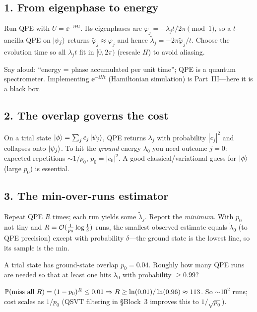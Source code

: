\documentclass[11pt]{article}
\begin{document}
\subsection*{1. From eigenphase to energy }
\begin{board}
Run QPE with $U=\ee^{-\ii Ht}$. Its eigenphases are $\varphi_j=-\lambda_j t/2\pi \pmod1$,
so a $t$-ancilla QPE on $\ket{\psi_j}$ returns $\widetilde\varphi_j\approx\varphi_j$ and
hence $\widetilde\lambda_j=-2\pi\widetilde\varphi_j/t$. Choose the evolution time so all
$\lambda_j t$ fit in $[0,2\pi)$ (rescale $H$) to avoid aliasing.
\end{board}
Say aloud: ``energy = phase accumulated per unit time''; QPE is a quantum spectrometer.
Implementing $\ee^{-\ii Ht}$ (Hamiltonian simulation) is Part~III---here it is a black box.

\subsection*{2. The overlap governs the cost }
\begin{board}
On a trial state $\ket\phi=\sum_j c_j\ket{\psi_j}$, QPE returns $\lambda_j$ with
probability $|c_j|^2$ and collapses onto $\ket{\psi_j}$. To hit the \emph{ground} energy
$\lambda_0$ you need outcome $j=0$: expected repetitions $\sim 1/p_0$, $p_0=|c_0|^2$.
A good classical/variational guess for $\ket\phi$ (large $p_0$) is essential.
\end{board}

\subsection*{3. The min-over-runs estimator }
\begin{board}
Repeat QPE $R$ times; each run yields some $\widetilde\lambda_{j}$. Report the
\emph{minimum}. With $p_0$ not tiny and $R=\mathcal{O}(\tfrac1{p_0}\log\tfrac1\delta)$ runs, the
smallest observed estimate equals $\widetilde\lambda_0$ (to QPE precision) except with
probability $\delta$---the ground state is the lowest line, so its sample is the min.
\end{board}

\begin{inclass}\label{ic:l5-overlap}
A trial state has ground-state overlap $p_0=0.04$. Roughly how many QPE runs are needed
so that at least one hits $\lambda_0$ with probability $\ge0.99$?
\end{inclass}
\begin{answer}
$\mathbb{P}(\text{miss all }R)=(1-p_0)^R\le0.01\Rightarrow R\ge\ln(0.01)/\ln(0.96)\approx113$.
So $\sim\!10^2$ runs; cost scales as $1/p_0$ (QSVT filtering in \S Block~3 improves this to $1/\sqrt{p_0}$).
\end{answer}
\end{document}
